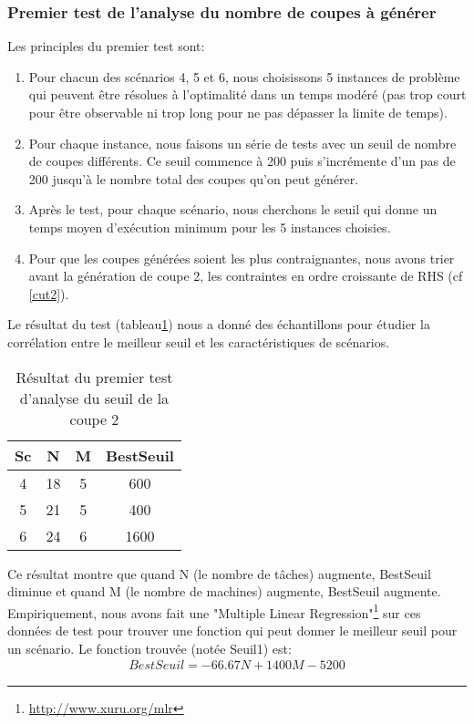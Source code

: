 \documentclass[twoside,fleqn]{EPURapport}
\begin{document}
\subsubsection{Premier test de l'analyse du nombre de coupes à générer}
Les principles du premier test sont:
\begin{enumerate}
	\item Pour chacun des scénarios 4, 5 et 6, nous choisissons 5 instances de problème qui peuvent être résolues à l'optimalité dans un temps modéré (pas trop court pour être observable ni trop long pour ne pas dépasser la limite de temps).
	\item Pour chaque instance, nous faisons un série de tests avec un seuil de nombre de coupes différents. Ce seuil commence à 200 puis s'incrémente d'un pas de 200 jusqu'à le nombre total des coupes qu'on peut générer.
	\item Après le test, pour chaque scénario, nous cherchons le seuil qui donne un temps moyen d'exécution minimum pour les 5 instances choisies.
	\item Pour que les coupes générées soient les plus contraignantes, nous avons trier avant la génération de coupe 2, les contraintes en ordre croissante de RHS (cf \ref{cut2}).
\end{enumerate}
	
Le résultat du test (tableau\ref{tab_pre_2_seuil}) nous a donné des échantillons pour étudier la corrélation entre le meilleur seuil et les caractéristiques de scénarios.

\begin{table}[h]
    \centering
    \begin{tabular}{|c|c|c|c|}
    	\hline
Sc& 	N	& M	& BestSeuil\\ \hline
4 & 	18	& 5	& 600      \\ \hline
5 & 	21	& 5	& 400      \\ \hline
6 & 	24	& 6	& 1600     \\ \hline
    \end{tabular}
    \caption{Résultat du premier test d'analyse du seuil de la coupe 2}
    \label{tab_pre_2_seuil}
\end{table}
\bigskip

Ce résultat montre que quand N (le nombre de tâches) augmente, BestSeuil diminue et quand M (le nombre de machines) augmente, BestSeuil augmente. Empiriquement, nous avons fait une "Multiple Linear Regression"\footnote{\url{http://www.xuru.org/mlr}} sur ces données de test pour trouver une fonction qui peut donner le meilleur seuil pour un scénario. Le fonction trouvée (notée Seuil1) est:
\begin{align}
BestSeuil=-66.67N+1400M-5200
\end{align}
\end{document}
